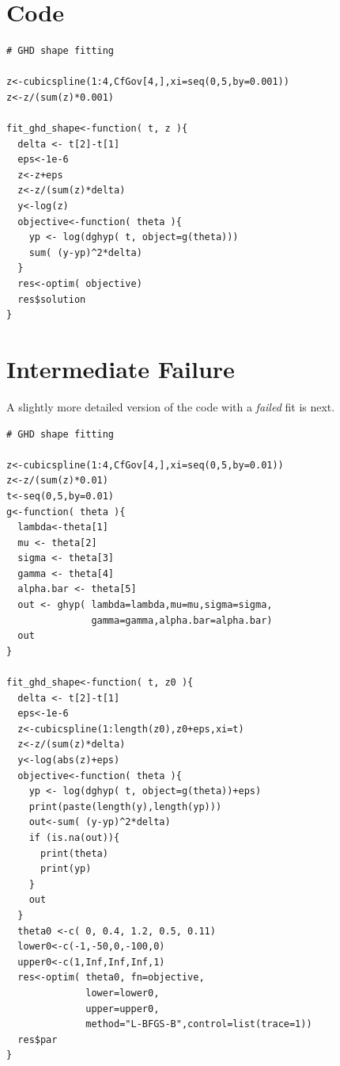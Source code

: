 \documentclass{amsart}
\begin{document}
\section{Code}

\begin{verbatim}
# GHD shape fitting

z<-cubicspline(1:4,CfGov[4,],xi=seq(0,5,by=0.001))
z<-z/(sum(z)*0.001)

fit_ghd_shape<-function( t, z ){
  delta <- t[2]-t[1]
  eps<-1e-6
  z<-z+eps
  z<-z/(sum(z)*delta)
  y<-log(z)
  objective<-function( theta ){
    yp <- log(dghyp( t, object=g(theta)))
    sum( (y-yp)^2*delta)
  }
  res<-optim( objective)
  res$solution
}
\end{verbatim}

\section{Intermediate Failure}

A slightly more detailed version of the code with a {\em failed} fit is next.

\begin{verbatim}
# GHD shape fitting

z<-cubicspline(1:4,CfGov[4,],xi=seq(0,5,by=0.01))
z<-z/(sum(z)*0.01)
t<-seq(0,5,by=0.01)
g<-function( theta ){
  lambda<-theta[1]
  mu <- theta[2]
  sigma <- theta[3]
  gamma <- theta[4]
  alpha.bar <- theta[5]
  out <- ghyp( lambda=lambda,mu=mu,sigma=sigma,
               gamma=gamma,alpha.bar=alpha.bar)
  out
}

fit_ghd_shape<-function( t, z0 ){
  delta <- t[2]-t[1]
  eps<-1e-6
  z<-cubicspline(1:length(z0),z0+eps,xi=t)
  z<-z/(sum(z)*delta)
  y<-log(abs(z)+eps)
  objective<-function( theta ){
    yp <- log(dghyp( t, object=g(theta))+eps)
    print(paste(length(y),length(yp)))
    out<-sum( (y-yp)^2*delta)
    if (is.na(out)){
      print(theta)
      print(yp)    
    }
    out
  }
  theta0 <-c( 0, 0.4, 1.2, 0.5, 0.11)
  lower0<-c(-1,-50,0,-100,0)
  upper0<-c(1,Inf,Inf,Inf,1)
  res<-optim( theta0, fn=objective,
              lower=lower0,
              upper=upper0,
              method="L-BFGS-B",control=list(trace=1))
  res$par
}
\end{verbatim}
\end{document}
